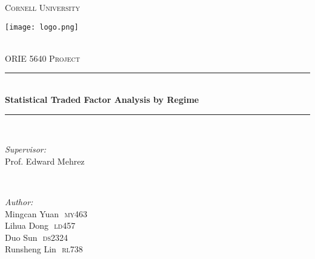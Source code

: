 \documentclass[12pt]{article}
\begin{document}
\begin{titlepage}

\newcommand{\HRule}{\rule{\linewidth}{0.5mm}} %

\center %
 

\textsc{\LARGE Cornell University}\\[0.5cm] %
\begin{minipage}{16em}
\centering\texttt{[image: logo.png]}\\
\end{minipage}\\[0.5cm]
\textsc{\Large ORIE 5640 Project}\\[0.5cm] %


\HRule \\[0.4cm]
{\LARGE \bfseries Statistical Traded Factor Analysis by Regime}\\[0.4cm] %
\HRule \\[1.5cm]
 

\begin{minipage}{0.4\textwidth}
\begin{flushleft} \large
\emph{Supervisor:}\\ 
Prof. Edward Mehrez \\ %
\end{flushleft}
\end{minipage}
~
\begin{minipage}{0.4\textwidth}
\begin{flushleft} \large
\emph{Author:} \\
Mingcan Yuan\,\, \textsc{my463}\\
Lihua Dong\,\, \textsc{ld457} \\
Duo Sun\,\, \textsc{ds2324}\\
Runsheng Lin\,\, \textsc{rl738}\\
\end{flushleft}
\end{minipage}\\[3cm]


\end{titlepage}
\end{document}
